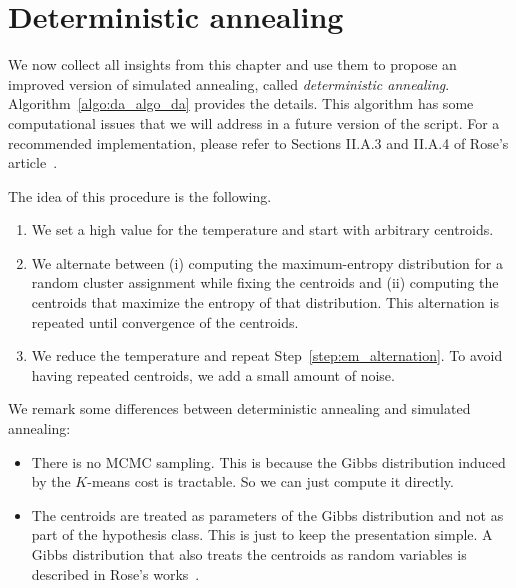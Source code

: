 \section{Deterministic annealing}
\label{sec:algo_da}

We now collect all insights from this chapter and use them to propose
an improved version of simulated annealing, called \emph{deterministic annealing}.
Algorithm~\ref{algo:da_algo_da} provides the details. This algorithm has some computational issues that we will address in a future version of the script. For a recommended implementation, please refer to Sections II.A.3 and II.A.4 of Rose's article~\cite{rose1998deterministic}. 

The idea of this procedure is the
following.

\begin{enumerate}
\item We set a high value for the temperature and start with arbitrary
centroids.
\item \label{step:em_alternation} We alternate between (i) computing the maximum-entropy distribution
for a random cluster assignment while fixing the centroids
and (ii) computing the centroids that maximize the entropy of that
distribution. This alternation is repeated until convergence of the
centroids.
\item We reduce the temperature and repeat Step~\ref{step:em_alternation}. To avoid having repeated
centroids, we add a small amount of noise.
\end{enumerate}

We remark some differences between deterministic annealing and simulated
annealing:

\begin{itemize}
\item There is no MCMC sampling. This is because the Gibbs distribution
induced by the $K$-means cost is tractable. So we can just compute it
directly.
\item The centroids are treated as parameters of the Gibbs distribution
and not as part of the hypothesis class. This is just to keep the presentation simple. A Gibbs distribution that also treats the centroids as random variables is described in Rose's works~\cite{rose1991deterministic, rose1998deterministic}.
\end{itemize}

